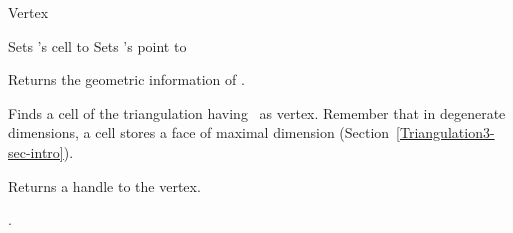\begin{ccRefClass}{Vertex}
\begin{ccAdvanced}




\ccOperations

{Sets \ccVar's cell to }
{Sets \ccVar's point to }

\end{ccAdvanced}

\ccAccessFunctions

{Returns the geometric information of \ccVar.}

{Finds a cell of the triangulation having \ccVar\ as
vertex. Remember that in degenerate dimensions, a cell stores a face
of maximal dimension (Section~\ref{Triangulation3-sec-intro}).}

{Returns a handle to the vertex.}



\ccSeeAlso

.

\end{ccRefClass}


